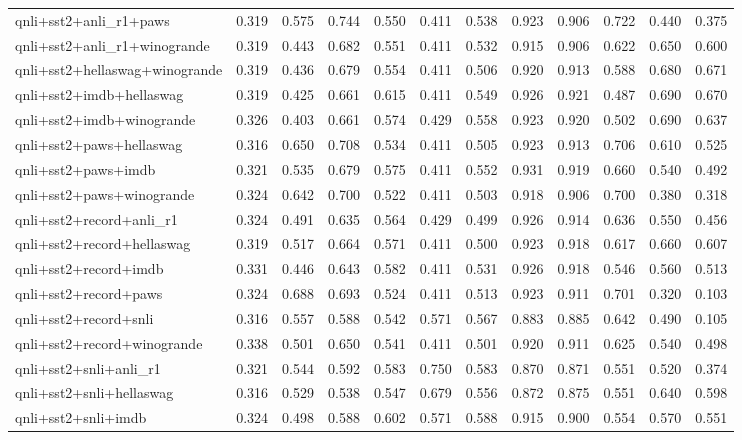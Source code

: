\begin{table}[t]
\begin{tabular}{lrrrrrrrrrrr}
    qnli+sst2+anli\_r1+paws & 0.319 & 0.575 & 0.744 & 0.550 & 0.411 & 0.538 & 0.923 & 0.906 & 0.722 & 0.440 & 0.375 \\
    qnli+sst2+anli\_r1+winogrande & 0.319 & 0.443 & 0.682 & 0.551 & 0.411 & 0.532 & 0.915 & 0.906 & 0.622 & 0.650 & 0.600 \\
    qnli+sst2+hellaswag+winogrande & 0.319 & 0.436 & 0.679 & 0.554 & 0.411 & 0.506 & 0.920 & 0.913 & 0.588 & 0.680 & 0.671 \\
    qnli+sst2+imdb+hellaswag & 0.319 & 0.425 & 0.661 & 0.615 & 0.411 & 0.549 & 0.926 & 0.921 & 0.487 & 0.690 & 0.670 \\
    qnli+sst2+imdb+winogrande & 0.326 & 0.403 & 0.661 & 0.574 & 0.429 & 0.558 & 0.923 & 0.920 & 0.502 & 0.690 & 0.637 \\
    qnli+sst2+paws+hellaswag & 0.316 & 0.650 & 0.708 & 0.534 & 0.411 & 0.505 & 0.923 & 0.913 & 0.706 & 0.610 & 0.525 \\
    qnli+sst2+paws+imdb & 0.321 & 0.535 & 0.679 & 0.575 & 0.411 & 0.552 & 0.931 & 0.919 & 0.660 & 0.540 & 0.492 \\
    qnli+sst2+paws+winogrande & 0.324 & 0.642 & 0.700 & 0.522 & 0.411 & 0.503 & 0.918 & 0.906 & 0.700 & 0.380 & 0.318 \\
    qnli+sst2+record+anli\_r1 & 0.324 & 0.491 & 0.635 & 0.564 & 0.429 & 0.499 & 0.926 & 0.914 & 0.636 & 0.550 & 0.456 \\
    qnli+sst2+record+hellaswag & 0.319 & 0.517 & 0.664 & 0.571 & 0.411 & 0.500 & 0.923 & 0.918 & 0.617 & 0.660 & 0.607 \\
    qnli+sst2+record+imdb & 0.331 & 0.446 & 0.643 & 0.582 & 0.411 & 0.531 & 0.926 & 0.918 & 0.546 & 0.560 & 0.513 \\
    qnli+sst2+record+paws & 0.324 & 0.688 & 0.693 & 0.524 & 0.411 & 0.513 & 0.923 & 0.911 & 0.701 & 0.320 & 0.103 \\
    qnli+sst2+record+snli & 0.316 & 0.557 & 0.588 & 0.542 & 0.571 & 0.567 & 0.883 & 0.885 & 0.642 & 0.490 & 0.105 \\
    qnli+sst2+record+winogrande & 0.338 & 0.501 & 0.650 & 0.541 & 0.411 & 0.501 & 0.920 & 0.911 & 0.625 & 0.540 & 0.498 \\
    qnli+sst2+snli+anli\_r1 & 0.321 & 0.544 & 0.592 & 0.583 & 0.750 & 0.583 & 0.870 & 0.871 & 0.551 & 0.520 & 0.374 \\
    qnli+sst2+snli+hellaswag & 0.316 & 0.529 & 0.538 & 0.547 & 0.679 & 0.556 & 0.872 & 0.875 & 0.551 & 0.640 & 0.598 \\
    qnli+sst2+snli+imdb & 0.324 & 0.498 & 0.588 & 0.602 & 0.571 & 0.588 & 0.915 & 0.900 & 0.554 & 0.570 & 0.551 \\

\end{tabular}
\end{table}
